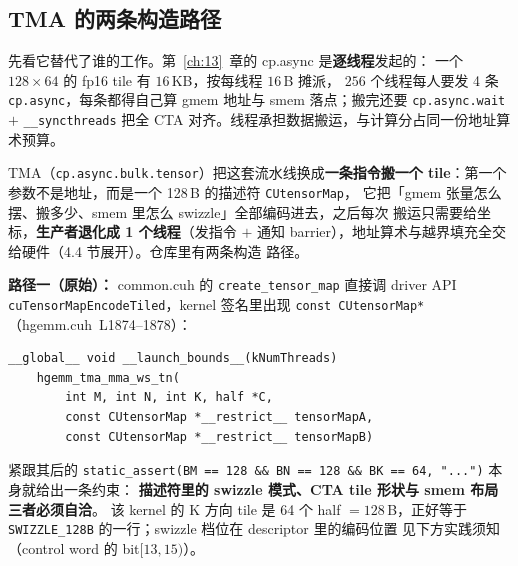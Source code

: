 \subsection{TMA 的两条构造路径}

先看它替代了谁的工作。第~\ref{ch:13}~章的 cp.async 是\textbf{逐线程}发起的：
一个 $128\times64$ 的 fp16 tile 有 $16$\,KB，按每线程 $16$\,B 摊派，
$256$ 个线程每人要发 4 条 \texttt{cp.async}，每条都得自己算 gmem 地址与
smem 落点；搬完还要 \texttt{cp.\allowbreak{}async.\allowbreak{}wait} $+$ \texttt{\_\allowbreak{}\_\allowbreak{}syncthreads}
把全 CTA 对齐。线程承担数据搬运，与计算分占同一份地址算术预算。

TMA（\texttt{cp.\allowbreak{}async.\allowbreak{}bulk.\allowbreak{}tensor}）把这套流水线换成\textbf{一条指令搬一个
tile}：第一个参数不是地址，而是一个 128\,B 的描述符 \texttt{CUtensorMap}，
它把「gmem 张量怎么摆、搬多少、smem 里怎么 swizzle」全部编码进去，之后每次
搬运只需要给坐标，\textbf{生产者退化成 1 个线程}（发指令 $+$ 通知
barrier），地址算术与越界填充全交给硬件（4.4 节展开）。仓库里有两条构造
路径。

\textbf{路径一（原始）：} common.cuh 的 \texttt{create\_\allowbreak{}tensor\_\allowbreak{}map} 直接调
driver API \texttt{cu\allowbreak{}Tensor\allowbreak{}Map\allowbreak{}Encode\allowbreak{}Tiled}，kernel 签名里出现
\texttt{const CUtensor\allowbreak{}Map*}（hgemm.cuh~L1874--1878）：

\begin{lstlisting}
__global__ void __launch_bounds__(kNumThreads)
    hgemm_tma_mma_ws_tn(
        int M, int N, int K, half *C,
        const CUtensorMap *__restrict__ tensorMapA,
        const CUtensorMap *__restrict__ tensorMapB)
\end{lstlisting}

紧跟其后的 \texttt{static\_\allowbreak{}assert\allowbreak{}(BM =\allowbreak{}=\allowbreak{} 128 \&\& BN =\allowbreak{}=\allowbreak{} 128 \&\& BK =\allowbreak{}=\allowbreak{} 64,\allowbreak{}
"...")} 本身就给出一条约束：
\textbf{描述符里的 swizzle 模式、CTA tile 形状与 smem 布局三者必须自洽}。
该 kernel 的 K 方向 tile 是 64 个 half $=128$\,B，正好等于
\texttt{SWIZZLE\_\allowbreak{}128\allowbreak{}B} 的一行；swizzle 档位在 descriptor 里的编码位置
见下方实践须知（control word 的 bit$[13,15)$）。


